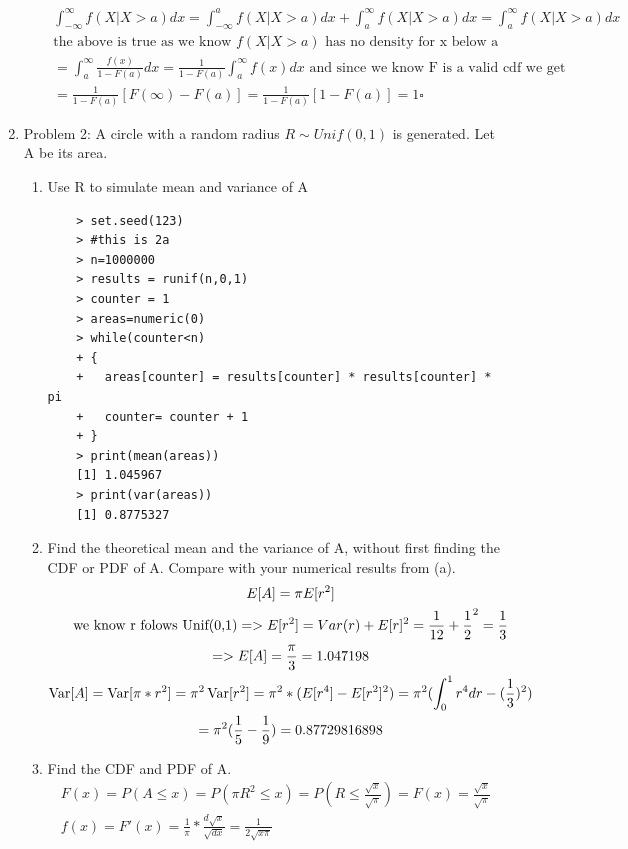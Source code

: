 \documentclass[11pt]{article}
\newcommand{\var}{\mathop{\rm Var}}
\begin{document}
\begin{enumerate}
\begin{enumerate}
\begin{gather}
	\int_{-\infty}^{\infty} f(X|X>a)dx = \int_{-\infty}^{a} f(X|X>a)dx + \int_{a}^{\infty} f(X|X>a)dx = \int_{a}^{\infty} f(X|X>a)dx\\
	\text{the above is true as we know $f(X|X>a)$ has no density for x below a}
	\\
	=\int_{a}^{\infty} \frac{f(x)}{1-F(a)}dx = \frac{1}{1-F(a)}\int_{a}^{\infty} f(x)dx \text{ and since we know F is a valid cdf we get }\\
	= \frac{1}{1-F(a)}[F(\infty) -F(a)] = \frac{1}{1-F(a)}[1 -F(a)] = 1 \square 
	\end{gather}
\end{enumerate}
\item Problem 2: A circle with a random radius $R \sim Unif(0,1)$ is generated. Let A be its area.
\\
\begin{enumerate}
	\item Use R to simulate mean and variance of A
	\\
	\begin{verbatim}
	> set.seed(123)
	> #this is 2a
	> n=1000000
	> results = runif(n,0,1)
	> counter = 1
	> areas=numeric(0)
	> while(counter<n)
	+ {
	+   areas[counter] = results[counter] * results[counter] * pi
	+   counter= counter + 1
	+ }
	> print(mean(areas))
	[1] 1.045967
	> print(var(areas))
	[1] 0.8775327
	\end{verbatim}
	\item Find the theoretical mean and the variance of A, without first finding the CDF or PDF of A. Compare
	with your numerical results from (a).
	\begin{gather}
	E[A] = \pi E[r^2]\\
	\text{we know r folows Unif(0,1)} => E[r^2] = Var(r) + E[r]^2 = \frac{1}{12} + \frac{1}{2}^2 = \frac{1}{3}\\
	=> E[A] = \frac{\pi}{3} = 1.047198\\
	\var[A] = \var[\pi * r^2] = \pi^2\var[r^2] = \pi^2 * (E[r^4]-E[r^2]^2) = 
	\pi^2 (\int_{0}^{1}r^4 dr -(\frac{1}{3})^2) \\
	= \pi^2 (\frac{1}{5} -\frac{1}{9}) = 0.87729816898 
	\end{gather}
	\item Find the CDF and PDF of A.
	\begin{gather}
	F(x) = P(A \le x) = P(\pi R^2 \le x) = P(R \le \frac{\sqrt{x}}{\sqrt{\pi}})= F(x) = \frac{\sqrt{x}}{\sqrt{\pi}}\\
	f(x) = F'(x) = \frac{1}{\pi} * \frac{d\sqrt{x}}{\sqrt{dx}} = \frac{1}{2\sqrt{x \pi}}

\end{gather}
\end{enumerate}
\end{enumerate}
\end{document}
